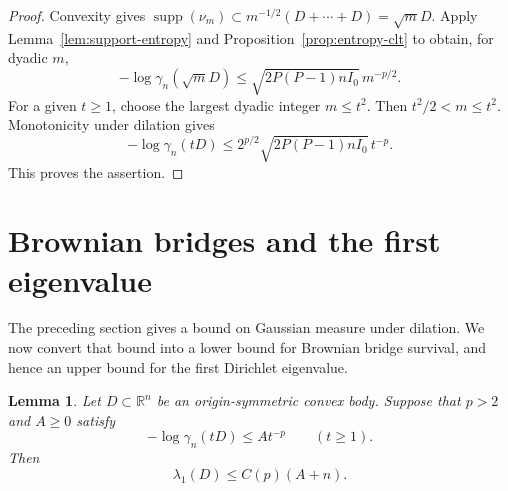 \documentclass[11pt]{amsart}
\numberwithin{equation}{section}
\newtheorem{lemma}[theorem]{Lemma}
\theoremstyle{definition}
\theoremstyle{remark}
\newcommand{\R}{\mathbb R}
\newcommand{\gam}{\gamma_n}
\DeclareMathOperator{\supp}{supp}
\begin{document}
\begin{proof}
Convexity gives
\(\supp(\nu_m)\subset m^{-1/2}(D+\cdots+D)=\sqrt mD\).
Apply Lemma~\ref{lem:support-entropy} and
Proposition~\ref{prop:entropy-clt} to obtain, for dyadic \(m\),
\[
-\log\gam(\sqrt mD)
\le \sqrt{2P(P-1)n I_0}\,m^{-p/2}.
\]
For a given \(t\ge1\), choose the largest dyadic integer \(m\le t^2\).
Then \(t^2/2<m\le t^2\). Monotonicity under dilation gives
\[
-\log\gam(tD)
\le 2^{p/2}\sqrt{2P(P-1)n I_0}\,t^{-p}.
\]
This proves the assertion.
\end{proof}

\section{Brownian bridges and the first eigenvalue}
\label{sec:bridge}

The preceding section gives a bound on Gaussian measure under dilation.
We now convert that bound into a lower bound for Brownian bridge
survival, and hence an upper bound for the first Dirichlet eigenvalue.

\begin{lemma}
\label{lem:bridge}
Let \(D\subset\R^n\) be an origin-symmetric convex body. Suppose that
\(p>2\) and \(A\ge0\) satisfy
\[
-\log\gam(tD)\le A t^{-p}\qquad(t\ge1).
\]
Then
\begin{equation}\label{eq:bridge-eigenvalue}
\lambda_1(D)\le C(p)(A+n).
\end{equation}
\end{lemma}
\end{document}
